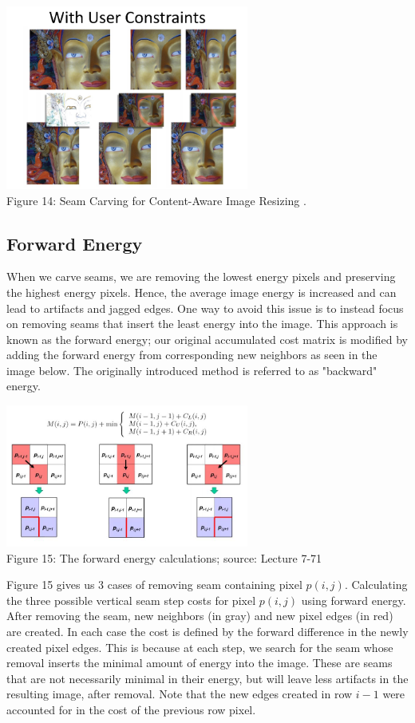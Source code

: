 \documentclass{article}
\begin{document}
\begin{center}
\includegraphics[width=8cm]{user_constraints.PNG} \\
Figure 14: Seam Carving	for	Content-Aware Image	Resizing \cite{avidan2007seam}.
\end{center}
%

\subsection{Forward Energy}
When we carve seams, we are removing the lowest energy pixels and preserving the highest energy pixels. Hence, the average image energy is increased and can lead to artifacts and jagged edges. One way to avoid this issue is to instead focus on removing seams that insert the least energy into the image. This approach is known as the forward energy; our original accumulated cost matrix is modified by adding the forward energy from corresponding new neighbors as seen in the image below. The originally introduced method is referred to as "backward" energy.

\begin{center}
\includegraphics[width=8cm]{forward_energy_calculation.JPG} \\
Figure 15: The forward energy calculations; source: Lecture 7-71
\end{center}

Figure 15 gives us 3 cases of removing seam containing pixel $p(i,j)$. Calculating the three possible vertical seam step costs for pixel $p(i,j)$ using forward energy. After removing the seam, new neighbors (in gray) and new pixel edges (in red) are created. In each case the cost is defined by the forward difference in the newly created pixel edges. This is because at each step, we search for the seam whose removal inserts the minimal amount of energy into the image. These are seams that are not necessarily minimal in their energy, but will leave less artifacts in the resulting image, after removal. Note that the new edges created in row $i-1$ were accounted for in the cost of the previous row pixel. 
\end{document}
